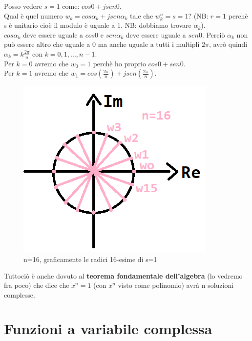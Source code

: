 Posso vedere $s=1$ come: $ cos0 + j sen0 $. \\
Qual è quel numero $ w_{k} =  cos\alpha_{k} + j sen \alpha_{k} $ tale che $ w_{k}^{n} = s = 1$? (NB: $ r =1 $ perchè s è unitario cioè il modulo è uguale a 1. NB: dobbiamo trovare $ \alpha_{k}$).\\
$ cos \alpha_{k} $ deve essere uguale a $ cos0 $ e $ sen \alpha_{k} $ deve essere uguale a $ sen0 $. Perciò $\alpha_{k}$ non può essere altro che uguale a $ 0 $ ma anche uguale a tutti i multipli $ 2 \pi$, avrò quindi $ \alpha_{k} = k \frac{ 2 \pi}{n}$ con $ k = 0,1,...,n-1 $.\\

Per $ k = 0$ avremo che $ w_{0} = 1 $ perchè ho proprio $ cos0 + sen0$. \\

Per $ k = 1$ avremo che $ w_{1} = cos(\frac{2 \pi}{n}) + j sen( \frac{2 \pi}{n}) $.\\

\begin{figure}[h]
	\centering
	\includegraphics[scale=0.5]{immagini/esempioSUnitario}
	\caption{ n=16, graficamente le radici 16-esime di s=1 }
	\label{fig: esempioRadiciSUNitario}
\end{figure}

Tuttociò è anche dovuto al \textbf{teorema fondamentale dell'algebra} (lo vedremo fra poco) che dice che $ x^{n} = 1$ (con $ x^{n}$ visto come polinomio) avrà n soluzioni complesse. \\

\pagebreak

\section{ Funzioni a variabile complessa }


